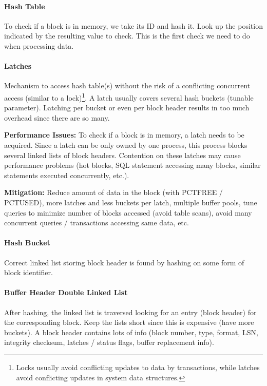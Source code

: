 \paragraph{Hash Table}
To check if a block is in memory, we take its ID and hash it. Look up the position indicated by the resulting value to check. This is the first check we need to do when processing data.

\paragraph{Latches}
Mechanism to access hash table(s) without the risk of a conflicting concurrent access (similar to a lock)\footnote{Locks usually avoid conflicting updates to data by transactions, while latches avoid conflicting updates in system data structures.}. A latch usually covers several hash buckets (tunable parameter). Latching per bucket or even per block header results in too much overhead since there are so many.

\textbf{Performance Issues:} To check if a block is in memory, a latch needs to be acquired. Since a latch can be only owned by one process, this process blocks several linked lists of block headers. Contention on these latches may cause performance problems (hot blocks, SQL statement accessing many blocks, similar statements executed concurrently, etc.).

\textbf{Mitigation:} Reduce amount of data in the block (with PCTFREE / PCTUSED), more latches and less buckets per latch, multiple buffer pools, tune queries to minimize number of blocks accessed (avoid table scans), avoid many concurrent queries / transactions accessing same data, etc.

\paragraph{Hash Bucket}
Correct linked list storing block header is found by hashing on some form of block identifier. 

\paragraph{Buffer Header Double Linked List}
After hashing, the linked list is traversed looking for an entry (block header) for the corresponding block. Keep the lists short since this is expensive (have more buckets). A block header contains lots of info (block number, type, format, LSN, integrity checksum, latches / status flags, buffer replacement info).

